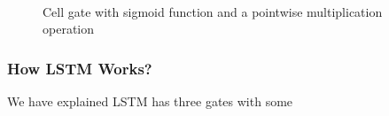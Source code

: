       
      
      \begin{figure}[ht!]
        \centering
        
        \caption{Cell gate with sigmoid function and a pointwise multiplication operation~\cite{colah}}~\label{fig:LSTM-gate}
      \end{figure}




\subsubsection{How LSTM Works?}

We have explained LSTM has three gates with some 

